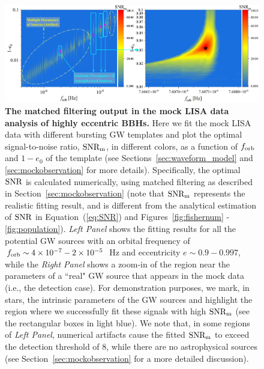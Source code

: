 \documentclass[%
 reprint,
 amsmath,amssymb,
 aps,
]{revtex4-2}
\begin{document}
\begin{figure}[htbp]
    \centering
    \includegraphics[width=7in]{MF_result.png} 
    \caption{{\bf The matched filtering output in the mock LISA data analysis of highly eccentric BBHs.} Here we fit the mock LISA data with different bursting GW templates and plot the optimal signal-to-noise ratio, $\rm SNR_m$, in different colors, as a function of $f_{\rm orb}$ and $1-e_0$ of the template (see Sections~\ref{sec:waveform_model} and \ref{sec:mockobservation} for more details). Specifically, the optimal $\rm SNR$ is calculated numerically, using matched filtering as described in Section~\ref{sec:mockobservation} (note that $\rm SNR_m$ represents the realistic fitting result, and is different from the analytical estimation of $\rm SNR$ in Equation~(\ref{eq:SNR}) and Figures~\ref{fig:fishernum} - \ref{fig:population}). {\it Left Panel} shows the fitting results for all the potential GW sources with an orbital frequency of $f_{\rm orb}\sim 4\times 10^{-7}-2\times 10^{-5}$~Hz and eccentricity $e\sim 0.9-0.997$, while the {\it Right Panel} shows a zoom-in of the region near the parameters of a ``real" GW source that appears in the mock data (i.e., the detection case). For demonstration purposes, we mark, in stars, the intrinsic parameters of the GW sources and highlight the region where we successfully fit these signals with high $\rm SNR_m$ (see the rectangular boxes in light blue). We note that, in some regions of {\it Left Panel}, numerical artifacts cause the fitted $\rm SNR_m$ to exceed the detection threshold of $8$, while there are no astrophysical sources (see Section~\ref{sec:mockobservation} for a more detailed discussion). 
    }
    \label{fig:mfresult}
\end{figure}
\end{document}
